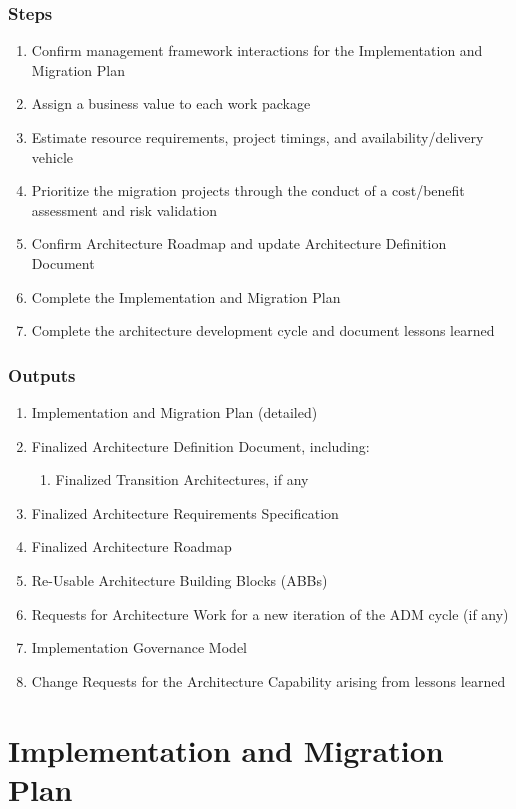 \documentclass[aspectratio=169, table]{beamer}
\begin{document}
	\begin{frame}
		\frametitle{Steps}
		\vspace{20pt}
		\begin{enumerate}
			\item Confirm management framework interactions for the Implementation and Migration Plan
			\item Assign a business value to each work package
			\item Estimate resource requirements, project timings, and availability/delivery vehicle
			\item Prioritize the migration projects through the conduct of a cost/benefit assessment and risk validation
			\item Confirm Architecture Roadmap and update Architecture Definition Document
			\item Complete the Implementation and Migration Plan
			\item Complete the architecture development cycle and document lessons learned
		\end{enumerate}
	\end{frame}


	\begin{frame}
		\frametitle{Outputs}
		\vspace{20pt}
		\begin{enumerate}
			\item Implementation and Migration Plan (detailed)
			\item Finalized Architecture Definition Document, including:
			\begin{enumerate}
				\item Finalized Transition Architectures, if any
			\end{enumerate}
			\item Finalized Architecture Requirements Specification
			\item Finalized Architecture Roadmap
			\item Re-Usable Architecture Building Blocks (ABBs)
			\item Requests for Architecture Work for a new iteration of the ADM cycle (if any)
			\item Implementation Governance Model
			\item Change Requests for the Architecture Capability arising from lessons learned
		\end{enumerate}
	\end{frame}


\section{Implementation and Migration Plan}
\end{document}
